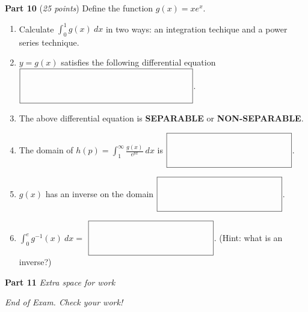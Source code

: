 \documentclass[12pt]{article}
\begin{document}
\textbf{Part 10} (\textit{25 points}) Define the function $g(x)=xe^{x}$. 
\begin{enumerate}[label=\textbf{Q\arabic*}]
    \item Calculate $\displaystyle\int_{0}^{1}g(x)\ dx$ in two ways: an integration techique and a power series technique.  
    \vspace{3.0cm}
    \item $y=g(x)$ satisfies the following differential equation $\displaystyle \fbox{\raisebox{-0.4\height}{\makebox[7cm]{\rule{0pt}{8ex}}}}$. 
    \vspace{1.5cm}
    \item The above differential equation is \textbf{SEPARABLE} or \textbf{NON-SEPARABLE}. 
    \item The domain of $\displaystyle h(p)=\int_{1}^{\infty}\frac{g(x)}{e^{px}}\ dx$ is $\displaystyle \fbox{\raisebox{-0.4\height}{\makebox[5cm]{\rule{0pt}{8ex}}}}$. 
    \vspace{2.5cm}
    \item  $g(x)$ has an inverse on the domain $\displaystyle \fbox{\raisebox{-0.4\height}{\makebox[5cm]{\rule{0pt}{8ex}}}}$.
    \vspace{2.5cm}
    \item $\displaystyle\int_{0}^{e}g^{-1}(x)\ dx=$ $\displaystyle \fbox{\raisebox{-0.4\height}{\makebox[5cm]{\rule{0pt}{8ex}}}}$. (Hint: what is an inverse?)
\end{enumerate}

\newpage

\textbf{Part 11} \textit{Extra space for work}


\vfill
\centering\textit{End of Exam. Check your work!}
\end{document}
